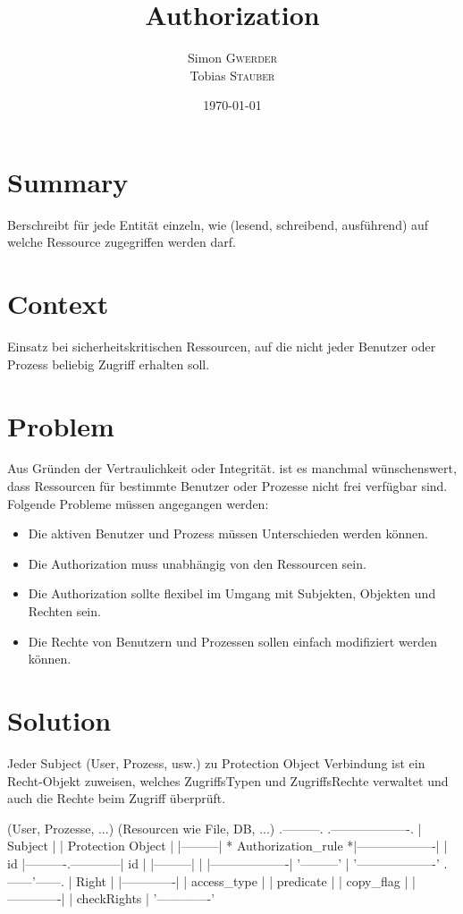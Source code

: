 \documentclass{article}
\title{Authorization} %
\author{Simon \textsc{Gwerder}\\Tobias \textsc{Stauber}} %
\date{\today} %
\begin{document}
	
	\maketitle %
	
	
	\section{Summary}
  Berschreibt für jede Entität einzeln, wie (lesend, schreibend, ausführend) auf welche Ressource zugegriffen werden darf.
	
	\section{Context}
	Einsatz bei sicherheitskritischen Ressourcen, auf die nicht jeder Benutzer oder Prozess beliebig Zugriff erhalten soll.
	
	\section{Problem}
	Aus Gründen der Vertraulichkeit oder Integrität. ist es manchmal wünschenswert, dass Ressourcen für bestimmte Benutzer oder Prozesse nicht frei verfügbar sind. Folgende Probleme müssen angegangen werden:\\
	\begin{itemize}{}{ }
		\item Die aktiven Benutzer und Prozess müssen Unterschieden werden können.
		\item Die Authorization muss unabhängig von den Ressourcen sein.
		\item Die Authorization sollte flexibel im Umgang mit Subjekten, Objekten und Rechten sein.
		\item Die Rechte von Benutzern und Prozessen sollen einfach modifiziert werden können.
	\end{itemize}

\section{Solution}
Jeder Subject (User, Prozess, usw.) zu Protection Object Verbindung ist ein Recht-Objekt zuweisen, welches ZugriffsTypen und ZugriffsRechte verwaltet und auch die Rechte beim Zugriff überprüft.

 (User, Prozesse, ...)           (Resourcen wie File, DB, ...)
 .---------.                       .-------------------.
 | Subject |                       | Protection Object |
 |---------| * Authorization_rule *|-------------------|
 | id      |----------.------------| id                |
 |---------|          |            |-------------------|
 '---------'          |            '-------------------'
               .------'------.
               | Right       |
               |-------------|
               | access_type |
               | predicate   |
               | copy_flag   |
               |-------------|
               | checkRights |
               '-------------'
\end{document}
